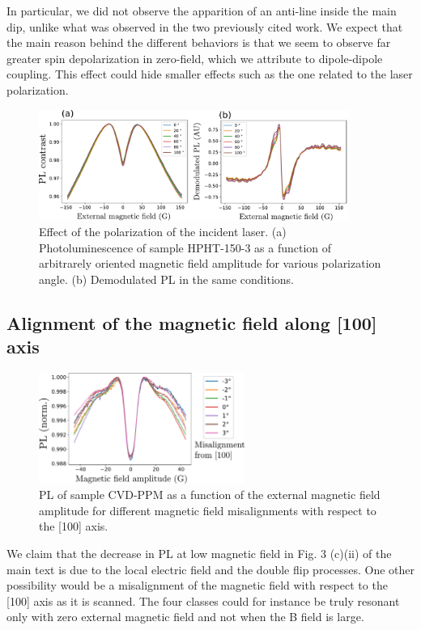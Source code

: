 \documentclass[preprintnumbers,amsmath,amssymb,onecolumn,12pt]{revtex4-2}\usepackage{graphicx}%
\begin{document}
In particular, we did not observe the apparition of an anti-line inside the main dip, unlike what was observed in the two previously cited work. We expect that the main reason behind the different behaviors is that we seem to observe far greater spin depolarization in zero-field, which we attribute to dipole-dipole coupling. This effect could hide smaller effects such as the one related to the laser polarization.
\begin{figure}[h]
\includegraphics[width=0.9\textwidth]{Figures_SI/fig_Pola}
\caption{Effect of the polarization of the incident laser. (a) Photoluminescence of sample HPHT-150-3 as a function of arbitrarely oriented magnetic field amplitude for various polarization angle. (b) Demodulated PL in the same conditions.}
\label{Pola}
\end{figure}
\subsection{Alignment of the magnetic field along [100] axis}
\begin{figure}[h]
\centering
\includegraphics[width=0.6\textwidth]{Figures_SI/alignement}
\caption{PL of sample CVD-PPM as a function of the external magnetic field amplitude for different magnetic field misalignments with respect to the [100] axis.}
\label{Alignment}
\end{figure}
We claim that the decrease in PL at low magnetic field in Fig. 3 (c)(ii) of the main text is due to the local electric field and the double flip processes. One other possibility would be a misalignment of the magnetic field with respect to the [100] axis as it is scanned. The four classes could for instance be truly resonant only with zero external magnetic field and not when the B field is large.
\end{document}
